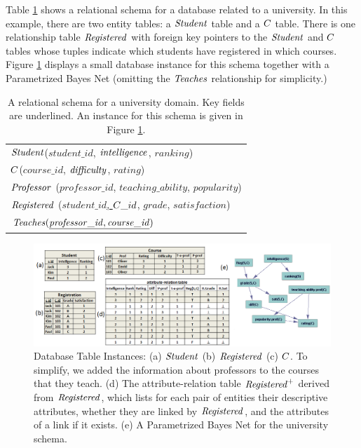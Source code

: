 \documentclass{article}
\begin{document}
Table \ref{table:university-schema} shows a relational schema for a database related to a university.
In this example, there are two entity tables: a $\mathit{Student}$ table and a $C$ table.  There is one relationship table $\mathit{Registered}$ with foreign key pointers to the $\mathit{Student}$ and $C$ tables whose tuples indicate which students have registered in which courses. 
 Figure \ref{fig:university-tables} displays a small database instance for this schema together with a Parametrized Bayes Net (omitting the $\it{Teaches}$ relationship for simplicity.) 
\begin{table}[tbp] \centering
\begin{tabular}
[c]{|l|}\hline
$\mathit{Student}$(\underline{$student\_id$}, $\mathit{intelligence}$, $ranking$)\\
$C$(\underline{$course\_id$}, $\mathit{difficulty}$, $rating$)\\ 
$\mathit{Professor}$ (\underline{$professor\_id$}, $teaching\_ability$, $popularity$)\\
$\mathit{Registered}$ (\underline{$student\_id$, $C\_id$}, $grade$, $satisfaction$)\\
$\it{Teaches}(\underline{\it{professor\_id, course\_id}})$
\\
\hline
\end{tabular}
\caption{A relational schema for a university domain. Key fields are underlined. An instance for this schema is given in Figure \ref{fig:university-tables}.
\label{table:university-schema}} 
\end{table}
 
\begin{figure}[htbp] %
   \centering
   \includegraphics[width=7in]{figures/university-tables3.png} 
  \caption{Database Table Instances: (a) $\mathit{Student}$ (b) $\mathit{Registered}$ (c) $C$. To simplify, we added the information about professors to the courses that they teach.  (d) The attribute-relation table $\mathit{Registered}^{+}$ derived from $\mathit{Registered}$, which lists for each pair of entities their descriptive attributes, whether they are linked by $\mathit{Registered}$, and the attributes of a link if it exists. (e) A Parametrized Bayes Net for the university schema.}
   \label{fig:university-tables}
\end{figure}
\end{document}
